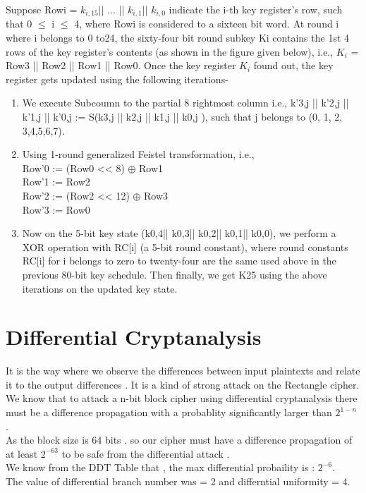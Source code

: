 \documentclass[journal=tosc,preprint]{iacrtrans}
\begin{document}
Suppose Rowi = $k_{i,15}$|| ... || $k_{i,1}$|| $k_{i,0}$ indicate the i-th key register’s row, such that 0 $\leq$ i $\leq$ 4, where Rowi is considered to a sixteen bit word. At round i where i belongs to 0 to24, the sixty-four bit round subkey Ki contains the 1st 4 rows of the key register’s
contents (as shown in the figure given below), i.e., $K_i$ = Row3 || Row2 || Row1 || Row0. Once the key register $K_i$ found out, the key register gets updated using the following iterations-\\
\begin{enumerate}
\item We execute Subcoumn to the partial 8 rightmost column i.e., k’3,j || k’2,j || k’1,j || k’0,j := S(k3,j || k2,j || k1,j || k0,j ), such that j belongs to (0, 1, 2, 3,4,5,6,7).\\
\item Using 1-round generalized Feistel transformation, i.e.,\\
Row'0 := (Row0 << 8) $\oplus$ Row1\\
Row'1 := Row2\\
Row'2 := (Row2 << 12) $\oplus$ Row3\\
Row'3 := Row0\\
\item  Now on the 5-bit key state (k0,4|| k0,3|| k0,2|| k0,1|| k0,0), we perform a XOR operation with RC[i] (a 5-bit round constant), where round constants RC[i] for i belongs to zero to twenty-four are the same used above in the previous 80-bit key schedule. Then finally, we get K25 using the above iterations on the updated key state.
\end{enumerate}


\section{Differential Cryptanalysis}



It is the way where we observe the differences between input plaintexts and relate it to the output differences . It is a kind of strong attack on the Rectangle cipher.\\
We know that to attack a n-bit block cipher using differential cryptanalysis there must be a difference propagation with a probablity significantly larger than $2^{1-n}$ .\\
As the block size is 64 bits . so our cipher must have a difference propagation of at least $2^{-63}$ to be safe from the differential attack . \\
We know from the DDT Table that , the max differential probaility is : $2^{-6}$.\\
The value of differential branch number was = 2 and differntial uniformity = 4.\\
\end{document}
